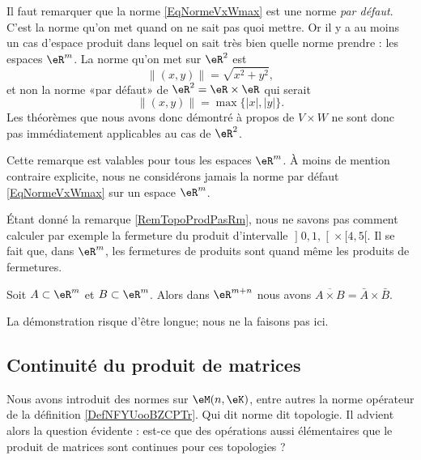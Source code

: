 \begin{remark}		\label{RemTopoProdPasRm}
	Il faut remarquer que la norme \eqref{EqNormeVxWmax} est une norme \emph{par défaut}. C'est la norme qu'on met quand on ne sait pas quoi mettre. Or il y a au moins un cas d'espace produit dans lequel on sait très bien quelle norme prendre : les espaces $\eR^m$. La norme qu'on met sur $\eR^2$ est
	\begin{equation}
		\| (x,y) \|=\sqrt{x^2+y^2},
	\end{equation}
	et non la norme «par défaut» de $\eR^2=\eR\times\eR$ qui serait
	\begin{equation}
		\| (x,y) \|=\max\{ | x |,| y | \}.
	\end{equation}
	Les théorèmes que nous avons donc démontré à propos de $V\times W$ ne sont donc pas immédiatement applicables au cas de $\eR^2$.

	Cette remarque est valables pour tous les espaces $\eR^m$. À moins de mention contraire explicite, nous ne considérons jamais la norme par défaut \eqref{EqNormeVxWmax} sur un espace $\eR^m$.
\end{remark}

Étant donné la remarque \ref{RemTopoProdPasRm}, nous ne savons pas comment calculer par exemple la fermeture du produit d'intervalle $\mathopen] 0,1 ,  \mathclose[\times\mathopen[ 4 , 5 [$. Il se fait que, dans $\eR^m$, les fermetures de produits sont quand même les produits de fermetures.

\begin{proposition}		\label{PropovlAxBbarAbraB}
	Soit $A\subset\eR^m$ et $B\subset\eR^m$. Alors dans $\eR^{m+n}$ nous avons $\overline{ A\times B }=\bar A\times \bar B$.
\end{proposition}

La démonstration risque d'être longue; nous ne la faisons pas ici.

\subsection{Continuité du produit de matrices}
\label{SUBSECooOAWAooFcyUfI}

Nous avons introduit des normes sur \( \eM(n,\eK)\), entre autres la norme opérateur de la définition \ref{DefNFYUooBZCPTr}. Qui dit norme dit topologie. Il advient alors la question évidente : est-ce que des opérations aussi élémentaires que le produit de matrices sont continues pour ces topologies ?
 

